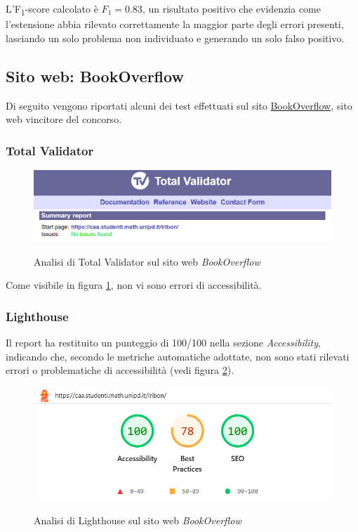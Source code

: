 \noindent L'F\textsubscript{1}-score calcolato è $F_{1}=0.83$, un risultato positivo che evidenzia come l’estensione abbia rilevato correttamente la maggior parte degli errori presenti, lasciando un solo problema non individuato e generando un solo falso positivo.


\subsection{Sito web: BookOverflow}
\noindent Di seguito vengono riportati alcuni dei test effettuati sul sito \href{https://caa.studenti.math.unipd.it/lribon/}{BookOverflow}, sito web vincitore del concorso.
\subsubsection{Total Validator}
\begin{figure}[H]
    \centering
    \includegraphics[width=0.8\linewidth, alt={Screenshot dell'analisi di Total Validator sul sito web BookOverflow}]{img/TV_bookoverflow.png}
    \caption{Analisi di Total Validator sul sito web \textit{BookOverflow}}\label{fig:TV_bookoverflow}
\end{figure}

\noindent Come visibile in figura \ref{fig:TV_bookoverflow}, non vi sono errori di accessibilità.

\subsubsection{Lighthouse}
\noindent Il report ha restituito un punteggio di 100/100 nella sezione \textit{Accessibility}, indicando che, secondo le metriche automatiche adottate, non sono stati rilevati errori o problematiche di accessibilità (vedi figura \ref{fig:Lighthouse_bookoverflow}).
\begin{figure}[H]
    \centering
    \includegraphics[width=0.6\linewidth, alt={Screenshot dell'analisi di Lighthouse sul sito web BookOverflow}]{img/Lighthouse_bookoverflow.png}
    \caption{Analisi di Lighthouse sul sito web \textit{BookOverflow}}\label{fig:Lighthouse_bookoverflow}
\end{figure}

